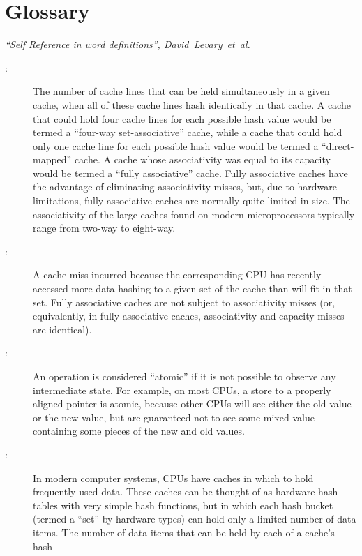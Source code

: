 
\chapter{Glossary}
%
	 {\emph{``Self Reference in word definitions'',
	        David~Levary~et~al.}}

\begin{description}
\item[:]
	The number of cache lines that can be held simultaneously in
	a given cache, when all of these cache lines hash identically
	in that cache.
	A cache that could hold four cache lines for each possible
	hash value would be termed a ``four-way set-associative'' cache,
	while a cache that could hold only one cache line for each
	possible hash value would be termed a ``direct-mapped'' cache.
	A cache whose associativity was equal to its capacity would
	be termed a ``fully associative'' cache.
	Fully associative caches have the advantage of eliminating
	associativity misses, but, due to hardware limitations,
	fully associative caches are normally quite limited in size.
	The associativity of the large caches found on modern microprocessors
	typically range from two-way to eight-way.
\item[:]
	A cache miss incurred because the corresponding CPU has recently
	accessed more data hashing to a given set of the cache than will
	fit in that set.
	Fully associative caches are not subject to associativity misses
	(or, equivalently, in fully associative caches, associativity
	and capacity misses are identical).
\item[:]
	An operation is considered ``atomic'' if it is not possible to
	observe any intermediate state.
	For example, on most CPUs, a store to a properly aligned pointer
	is atomic, because other CPUs will see either the old value or
	the new value, but are guaranteed not to see some mixed value
	containing some pieces of the new and old values.
\item[:]
	In modern computer systems, CPUs have caches in which to hold
	frequently used data.
	These caches can be thought of as hardware hash tables with very
	simple hash functions,
	but in which each hash bucket (termed a ``set'' by hardware types)
	can hold only a limited number of data items.
	The number of data items that can be held by each of a cache's hash

\end{description}
